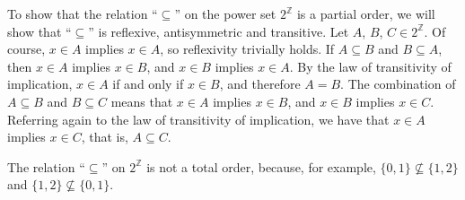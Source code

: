 \exercise
To show that the relation ``$\subseteq$'' on the power set $2^\mathbb{Z}$ is a partial order, we will show that ``$\subseteq$'' is reflexive, antisymmetric and transitive.
Let $A$, $B$, $C\in2^\mathbb{Z}$.
Of course, $x\in A$ implies $x\in A$, so reflexivity trivially holds.
If $A\subseteq B$ and $B\subseteq A$, then $x\in A$ implies $x\in B$, and $x\in B$ implies $x\in A$.
By the law of transitivity of implication, $x\in A$ if and only if $x\in B$, and therefore $A=B$.
The combination of $A\subseteq B$ and $B\subseteq C$ means that $x\in A$ implies $x\in B$, and $x\in B$ implies $x\in C$.
Referring again to the law of transitivity of implication, we have that $x\in A$ implies $x\in C$, that is, $A\subseteq C$.

The relation ``$\subseteq$'' on $2^\mathbb{Z}$ is not a total order, because, for example, $\{0,1\}\nsubseteq\{1,2\}$ and $\{1,2\}\nsubseteq\{0,1\}$.
